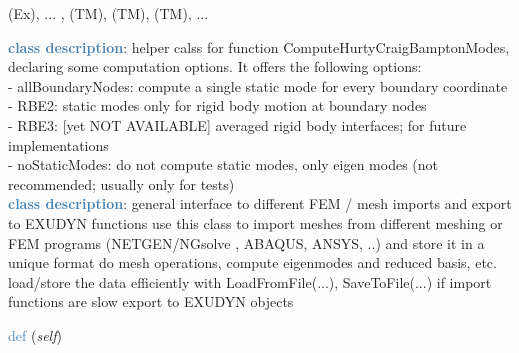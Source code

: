 \begin{itemize}[leftmargin=1.4cm]
\begin{itemize}[leftmargin=1.4cm]
\begin{itemize}[leftmargin=0.5cm]
\begin{itemize}[leftmargin=1.4cm]
\begin{itemize}[leftmargin=1.4cm]
\begin{itemize}[leftmargin=0.5cm]
 (Ex), 
 ...
, 
 (TM), 
 (TM), 
 (TM), 
 ...
\ei

%
\noindent\textcolor{steelblue}{{\bf class description}}:  helper calss for function ComputeHurtyCraigBamptonModes, declaring some computation options. It offers the following options:\\
 - allBoundaryNodes:     compute a single static mode for every boundary coordinate\\
 - RBE2:                 static modes only for rigid body motion at boundary nodes\\
 - RBE3:                 [yet NOT AVAILABLE] averaged rigid body interfaces; for future implementations\\
 - noStaticModes:        do not compute static modes, only eigen modes (not recommended; usually only for tests)
\vspace{3pt} \\ 
\noindent\textcolor{steelblue}{{\bf class description}}:  general interface to different FEM / mesh imports and export to EXUDYN functions
         use this class to import meshes from different meshing or FEM programs (NETGEN/NGsolve \cite{NGsolve2022}, ABAQUS, ANSYS, ..) and store it in a unique format
         do mesh operations, compute eigenmodes and reduced basis, etc.
         load/store the data efficiently with LoadFromFile(...), SaveToFile(...)  if import functions are slow
         export to EXUDYN objects
\vspace{3pt} \\ 
\begin{flushleft}
\noindent \textcolor{steelblue}{def {\bf {}}}\label{sec:FEM:FEMinterface:__init__}
({\it self})
\end{flushleft}

\end{itemize}
\end{itemize}
\end{itemize}
\end{itemize}
\end{itemize}
\end{itemize}

